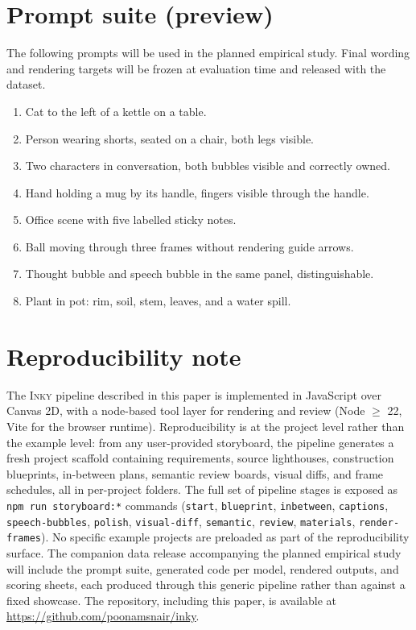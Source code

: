\documentclass[10pt,twocolumn]{article}
\newcommand{\inky}{\textsc{Inky}}
\begin{document}
\section{Prompt suite (preview)}
\label{app:prompts}

The following prompts will be used in the planned empirical study.
Final wording and rendering targets will be frozen at evaluation
time and released with the dataset.

\begin{enumerate}[leftmargin=*,nosep,itemsep=0.3em]
  \item Cat to the left of a kettle on a table.
  \item Person wearing shorts, seated on a chair, both legs visible.
  \item Two characters in conversation, both bubbles visible and correctly owned.
  \item Hand holding a mug by its handle, fingers visible through the handle.
  \item Office scene with five labelled sticky notes.
  \item Ball moving through three frames without rendering guide arrows.
  \item Thought bubble and speech bubble in the same panel, distinguishable.
  \item Plant in pot: rim, soil, stem, leaves, and a water spill.
\end{enumerate}

\section{Reproducibility note}
\label{app:repro}

The \inky{} pipeline described in this paper is implemented in
JavaScript over Canvas 2D, with a node-based tool layer for
rendering and review (Node $\geq$ 22, Vite for the browser
runtime). Reproducibility is at the project level rather than
the example level: from any user-provided storyboard, the
pipeline generates a fresh project scaffold containing
requirements, source lighthouses, construction blueprints,
in-between plans, semantic review boards, visual diffs, and
frame schedules, all in per-project folders. The full set of
pipeline stages is exposed as \texttt{npm run storyboard:*}
commands (\texttt{start}, \texttt{blueprint}, \texttt{inbetween},
\texttt{captions}, \texttt{speech-bubbles}, \texttt{polish},
\texttt{visual-diff}, \texttt{semantic}, \texttt{review},
\texttt{materials}, \texttt{render-frames}). No specific
example projects are preloaded as part of the reproducibility
surface. The companion data release accompanying the planned
empirical study will include the prompt suite, generated code
per model, rendered outputs, and scoring sheets, each produced
through this generic pipeline rather than against a fixed
showcase. The repository, including this paper, is available at
\url{https://github.com/poonamsnair/inky}.
\end{document}
